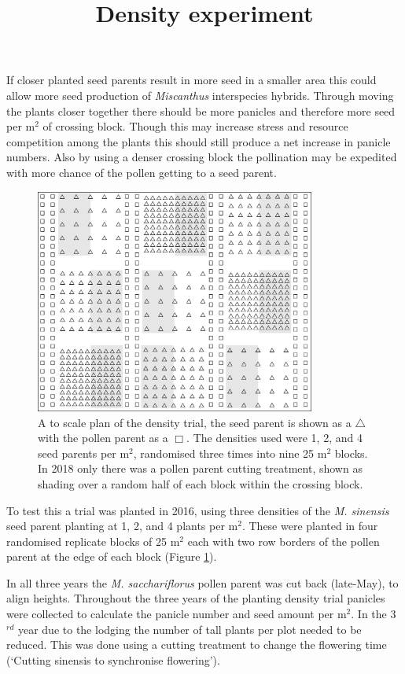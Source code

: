 \documentclass[fleqn, 15pt, lineno]{olplainarticle}
\begin{document}
\FloatBarrier
\title{Density experiment}

If closer planted seed parents result in more seed in a smaller area this could allow more seed production of \textit{Miscanthus} interspecies hybrids.
Through moving the plants closer together there should be more panicles and therefore more seed per m$^2$ of crossing block.
Though this may increase stress and resource competition among the plants this should still produce a net increase in panicle numbers.
Also by using a denser crossing block the pollination may be expedited with more chance of the pollen getting to a seed parent.

\begin{figure}
\centering
\includegraphics[width=0.82\textwidth]{Figs/CAT26Plan}
\caption{\label{fig:DensityPlan} A to scale plan of the density trial, the seed parent is shown as a $\bigtriangleup$ with the pollen parent as a $\Box$.
The densities used were 1, 2, and 4 seed parents per m$^2$, randomised three times into nine 25 m$^2$ blocks.
In 2018 only there was a pollen parent cutting treatment, shown as shading over a random half of each block within the crossing block.}
\end{figure}

To test this a trial was planted in 2016, using three densities of the \textit{M. sinensis} seed parent planting at 1, 2, and 4 plants per m$^2$.
These were planted in four randomised replicate blocks of 25 m$^2$ each with two row borders of the pollen parent at the edge of each block (Figure \ref{fig:DensityPlan}).

In all three years the \textit{M. sacchariflorus} pollen parent was cut back (late-May), to align heights.
Throughout the three years of the planting density trial panicles were collected to calculate the panicle number and seed amount per m$^2$. In the 3$^{rd}$ year due to the lodging the number of tall plants per plot needed to be reduced.
This was done using a cutting treatment to change the flowering time (`Cutting sinensis to synchronise flowering').
\end{document}
